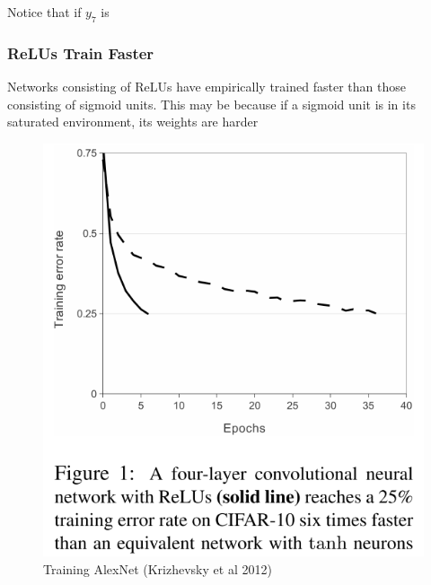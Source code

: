 \documentclass[a4paper,11pt]{article}
\begin{document}
Notice that if $y_7$ is 

\subsubsection{ReLUs Train Faster}

Networks consisting of ReLUs have empirically trained faster than those consisting of sigmoid units. This may be because if a sigmoid unit is in its saturated environment, its weights are harder 

\begin{figure}[h!]
	\centering
	\includegraphics[scale=0.3]{images/ReLU_train_fast.png}
	\caption{Training AlexNet (Krizhevsky et al 2012)}
\end{figure}
\end{document}
